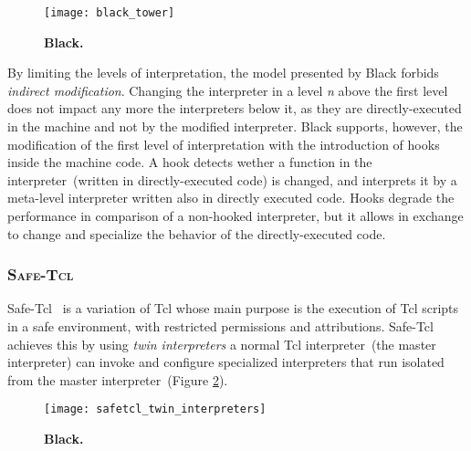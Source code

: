 \begin{figure}[ht]
\begin{center}
\texttt{[image: black\_tower]}
\caption{\textbf{Black.}\label{fig:black_tower}
 }
\end{center}
\end{figure}

By limiting the levels of interpretation, the model presented by Black forbids \emph{indirect modification}. Changing the interpreter in a level \emph{n} above the first level does not impact any more the interpreters below it, as they are directly-executed in the machine and not by the modified interpreter. Black supports, however, the modification of the first level of interpretation with the introduction of hooks inside the machine code. A hook detects wether a function in the interpreter~(written in directly-executed code) is changed, and interprets it by a meta-level interpreter written also in directly executed code. Hooks degrade the performance in comparison of a non-hooked interpreter, but it allows in exchange to change and specialize the behavior of the directly-executed code.

\subsubsection*{\textsc{Safe-Tcl}}
Safe-Tcl~\cite{Levy97a, Bore94a} is a variation of Tcl whose main purpose is the execution of Tcl scripts in a safe environment, with restricted permissions and attributions. Safe-Tcl achieves this by using \emph{twin interpreters} \ie a normal Tcl interpreter~(the master interpreter) can invoke and configure specialized interpreters that run isolated from the master interpreter~(Figure \ref{fig:safetcl_twin_interpreters}).

\begin{figure}[ht]
\begin{center}
\texttt{[image: safetcl\_twin\_interpreters]}
\caption{\textbf{Black.}\label{fig:safetcl_twin_interpreters}
 }
\end{center}
\end{figure}

